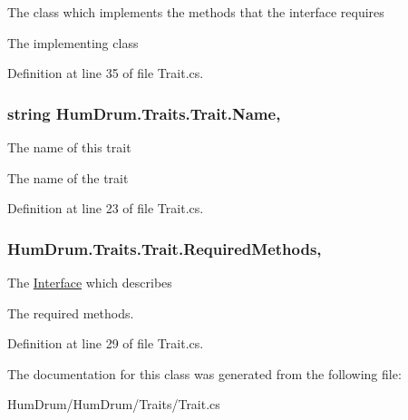 The class which implements the methods that the interface requires 

The implementing class

Definition at line 35 of file Trait.\+cs.

\subsubsection[{\texorpdfstring{Name}{Name}}]{\setlength{\rightskip}{0pt plus 5cm}string Hum\+Drum.\+Traits.\+Trait.\+Name\hspace{0.3cm}{\ttfamily [get]}, {\ttfamily [set]}}\hypertarget{classHumDrum_1_1Traits_1_1Trait_a1127f27ad57f5578c010c4785eac06b3}{}\label{classHumDrum_1_1Traits_1_1Trait_a1127f27ad57f5578c010c4785eac06b3}


The name of this trait 

The name of the trait

Definition at line 23 of file Trait.\+cs.

\subsubsection[{\texorpdfstring{Required\+Methods}{RequiredMethods}}]{ Hum\+Drum.\+Traits.\+Trait.\+Required\+Methods\hspace{0.3cm}{\ttfamily [get]}, {\ttfamily [set]}}\hypertarget{classHumDrum_1_1Traits_1_1Trait_a44f53e84d7ce34f84ce3be1e60345368}{}\label{classHumDrum_1_1Traits_1_1Trait_a44f53e84d7ce34f84ce3be1e60345368}


The \hyperlink{classHumDrum_1_1Traits_1_1Interface}{Interface} which describes 

The required methods.

Definition at line 29 of file Trait.\+cs.



The documentation for this class was generated from the following file\+:\begin{DoxyCompactItemize}
\item 
Hum\+Drum/\+Hum\+Drum/\+Traits/Trait.\+cs\end{DoxyCompactItemize}
